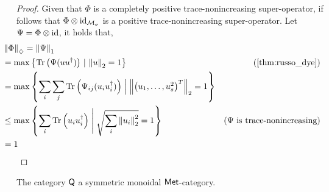   \begin{proof}
    Given that $\Phi$ is a  completely positive trace-nonincreasing super-operator, if follows that $ \Phi \otimes  \mathrm{id}_{\mathcal{M}_{\sigma}}$ is a positive trace-nonincreasing super-operator. Let $\Psi = \Phi \otimes \mathrm{id}$, it holds that,
    \begin{align*}
      & \hspace{-20pt} \diamondnorm{\Phi} =\tracenorm{\Psi}\\
      &  \hspace{-20pt} = \max \left\{\tr \left( \Psi (u u^\dag)\right) \, \vert \, \euclideannorm{u}=1 \right\}  & \left(\text{\autoref{thm:russo_dye}}\right)\\
      & \hspace{-20pt} = \max \left\{ \sum_i \sum_j \tr \left( \Psi_{ij} (u_i u_i^\dag)\right) \Bigm|  \euclideannorm{\begin{pmatrix} u_1, \ldots, u_s^2 \end{pmatrix}^T}=1 \right\} \\
      &  \hspace{-20pt} \leq \max \left\{ \sum_i \tr \left( u_i u_i^\dag \right) \Biggm| \sqrt{\sum_i \euclideannorm{u_i}^2}=1 \right\}   & (\Psi \text{ is trace-nonincreasing}) \\
      &  \hspace{-20pt} = 1
    \end{align*}
    
    
    
  \end{proof}

  

\begin{proposition} \label{prop:Q_monoidal}
  The category $\mathsf{Q}$ a symmetric monoidal $\mathsf{Met}$-category.
\end{proposition}


